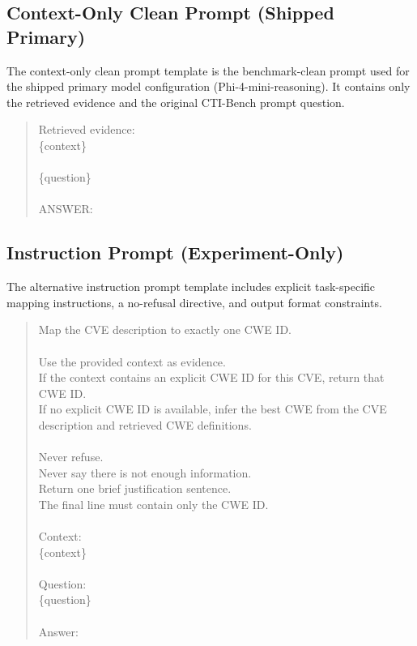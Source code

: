 \subsection{Context-Only Clean Prompt (Shipped Primary)}
\label{app:prompt-context-only}

The context-only clean prompt template is the benchmark-clean prompt used for the shipped primary model configuration (Phi-4-mini-reasoning). It contains only the retrieved evidence and the original CTI-Bench prompt question.

\begin{quote}\small\ttfamily
Retrieved evidence:\\
\{context\}\\
\\
\{question\}\\
\\
ANSWER:
\end{quote}

\subsection{Instruction Prompt (Experiment-Only)}
\label{app:prompt-instruction}

The alternative instruction prompt template includes explicit task-specific mapping instructions, a no-refusal directive, and output format constraints.

\begin{quote}\small\ttfamily
Map the CVE description to exactly one CWE ID.\\
\\
Use the provided context as evidence.\\
If the context contains an explicit CWE ID for this CVE, return that CWE ID.\\
If no explicit CWE ID is available, infer the best CWE from the CVE description and retrieved CWE definitions.\\
\\
Never refuse.\\
Never say there is not enough information.\\
Return one brief justification sentence.\\
The final line must contain only the CWE ID.\\
\\
Context:\\
\{context\}\\
\\
Question:\\
\{question\}\\
\\
Answer:
\end{quote}
